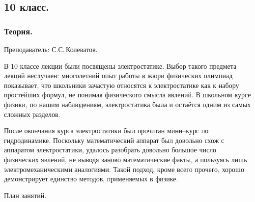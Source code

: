 \documentclass[12pt,a4paper,oneside,draft]{scrartcl}
\newlength{\h}
\newlength{\x}
\begin{document}
\subsection{10 класс.}
\label{sec:daily_10}

\subsubsection{Теория.}
\label{sec:daily_10_th}

\textsf{Преподаватель: С.С.\,Колеватов.}
\smallskip

В 10 классе лекции были посвящены электростатике. Выбор такого
предмета лекций неслучаен: многолетний опыт работы в жюри физических
олимпиад показывает, что школьники зачастую относятся к электростатике
как к набору простейших формул, не понимая физического смысла
явлений. В школьном курсе физики, по нашим наблюдениям, электростатика
была и остаётся одним из самых сложных разделов.

После окончания курса электростатики был прочитан мини–курс по
гидродинамике. Поскольку математический аппарат был довольно схож с
аппаратом электростатики, удалось разобрать довольно большое число
физических явлений, не выводя заново математические факты, а пользуясь
лишь электромеханическими аналогиями. Такой подход, кроме всего
прочего, хорошо демонстрирует единство методов, применяемых в физике. 

\begin{center}
  \textsf{План занятий.}
\end{center}
\end{document}
